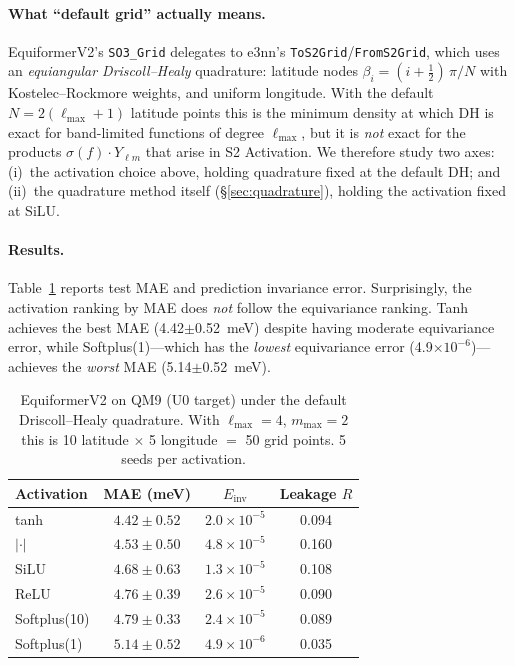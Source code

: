 \documentclass[10pt,twocolumn]{article}
\begin{document}
\paragraph{What ``default grid'' actually means.}
EquiformerV2's \texttt{SO3\_Grid} delegates to e3nn's
\texttt{ToS2Grid}/\texttt{FromS2Grid}, which uses an \emph{equiangular Driscoll--Healy}
quadrature: latitude nodes $\beta_i = (i + \tfrac{1}{2})\,\pi/N$ with Kostelec--Rockmore
weights, and uniform longitude. With the default $N = 2(\ell_{\max}{+}1)$ latitude points
this is the minimum density at which DH is exact for band-limited functions of degree
$\ell_{\max}$, but it is \emph{not} exact for the products $\sigma(f) \cdot Y_{\ell m}$
that arise in S2 Activation. We therefore study two axes: (i)~the activation choice
above, holding quadrature fixed at the default DH; and (ii)~the quadrature method itself
(\S\ref{sec:quadrature}), holding the activation fixed at SiLU.

\paragraph{Results.}
Table~\ref{tab:qm9} reports test MAE and prediction invariance error. Surprisingly,
the activation ranking by MAE does \emph{not} follow the equivariance ranking.
Tanh achieves the best MAE (4.42$\pm$0.52~meV) despite having moderate equivariance error,
while Softplus(1)---which has the \emph{lowest} equivariance error (4.9$\times10^{-6}$)---achieves
the \emph{worst} MAE (5.14$\pm$0.52~meV).

\begin{table}[t]
  \caption{EquiformerV2 on QM9 (U0 target) under the default Driscoll--Healy
  quadrature. With $\ell_{\max}{=}4$, $m_{\max}{=}2$ this is 10 latitude
  $\times$ 5 longitude $=$ 50 grid points. 5 seeds per activation.}
  \label{tab:qm9}
  \centering
  \small
  \begin{tabular}{lccc}
    \toprule
    Activation & MAE (meV) & $E_{\mathrm{inv}}$ & Leakage $R$ \\
    \midrule
    tanh           & $\mathbf{4.42 \pm 0.52}$ & $2.0{\times}10^{-5}$ & 0.094 \\
    $|\cdot|$      & $4.53 \pm 0.50$ & $4.8{\times}10^{-5}$ & 0.160 \\
    SiLU           & $4.68 \pm 0.63$ & $1.3{\times}10^{-5}$ & 0.108 \\
    ReLU           & $4.76 \pm 0.39$ & $2.6{\times}10^{-5}$ & 0.090 \\
    Softplus(10)   & $4.79 \pm 0.33$ & $2.4{\times}10^{-5}$ & 0.089 \\
    Softplus(1)    & $5.14 \pm 0.52$ & $4.9{\times}10^{-6}$ & 0.035 \\
    \bottomrule
  \end{tabular}
\end{table}
\end{document}
